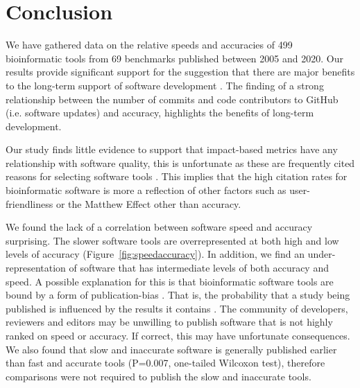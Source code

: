 \documentclass[fleqn,10pt]{SelfArx} %
\def\numTools{499}
\def\numBenchmarkPubs{69}
\begin{document}
\section*{Conclusion}

We have gathered data on the relative speeds and accuracies of
{\color{black}\numTools~} bioinformatic tools from
{\color{black}\numBenchmarkPubs} benchmarks published between
2005 and 2020. Our results provide significant support for the suggestion that there are major benefits to
the long-term support of software development \cite{siepel2019challenges}. The
finding of a strong relationship between the number of commits and code contributors to
GitHub (i.e. software updates) and accuracy, highlights the benefits of
long-term development.

Our study finds little evidence to support that impact-based metrics
have any relationship with software quality, this is unfortunate as these
are frequently cited reasons for selecting software tools
\cite{Loman2015-bw}. This implies that the high citation
rates for bioinformatic software
\cite{Perez-Iratxeta2007-lv,Van_Noorden2014-kc,Wren2016-xy} is more a
reflection of other factors such as user-friendliness or the Matthew Effect
\cite{Lariviere2010-kx,Merton1968-cb} other than accuracy.

We found the lack of a correlation between software speed and accuracy
surprising.  The slower software tools are overrepresented at both
high and low levels of accuracy (Figure~\ref{fig:speedaccuracy}).
In addition, we find an under-representation of software that has
intermediate levels of both accuracy and speed. A possible explanation
for this is that bioinformatic software tools are bound by a form of
publication-bias \cite{Boulesteix2015-am,Nissen:2016}. That is, the
probability that a study being published is influenced by the results
it contains \cite{sterling1995publication}. The community of
developers, reviewers and editors may be unwilling to publish software
that is not highly ranked on speed or accuracy. If correct, this may
have unfortunate consequences.  We also found that slow and inaccurate
software is generally published earlier than fast and accurate tools
{\color{black}(P=0.007, one-tailed Wilcoxon test)}, therefore
comparisons were not required to publish the slow and
inaccurate tools.

\end{document}
